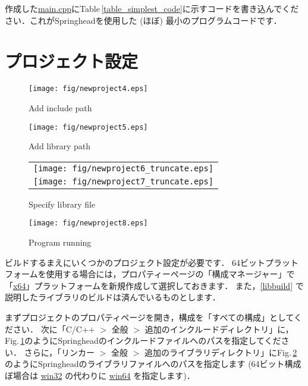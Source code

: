 \KLUDGE 作成した\url{main.cpp}\KLUDGE にTable\,\ref{table_simplest_code}\KLUDGE に示すコードを書き込んでください．これがSpringhead\KLUDGE を使用した (\KLUDGE ほぼ) \KLUDGE 最小のプログラムコードです．

\section*{\KLUDGE プロジェクト設定}

\begin{figure}[t]
\begin{center}
\texttt{[image: fig/newproject4.eps]}
\end{center}
\caption{Add include path}
\label{fig_newproject4}
\end{figure}

\begin{figure}[t]
\begin{center}
\texttt{[image: fig/newproject5.eps]}
\end{center}
\caption{Add library path}
\label{fig_newproject5}
\end{figure}

\begin{figure}[t]
\begin{center}
\begin{tabular}{c}
\texttt{[image: fig/newproject6\_truncate.eps]} \\
\texttt{[image: fig/newproject7\_truncate.eps]}
\end{tabular}
\end{center}
\caption{Specify library file}
\label{fig_newproject6}
\end{figure}

\begin{figure}[t]
\begin{center}
\texttt{[image: fig/newproject8.eps]}
\end{center}
\caption{Program running}
\label{fig_newproject8}
\end{figure}

\KLUDGE ビルドするまえにいくつかのプロジェクト設定が必要です．
64\KLUDGE ビットプラットフォームを使用する場合には，プロパティーページの「構成マネージャー」で「\url{x64}\KLUDGE 」プラットフォームを新規作成して選択しておきます．
\KLUDGE また，\ref{libbuild} \KLUDGE で説明したライブラリのビルドは済んでいるものとします．

\KLUDGE まずプロジェクトのプロパティページを開き，構成を「すべての構成」としてください．
\KLUDGE 次に「C/C++ $>$ \KLUDGE 全般 $>$ \KLUDGE 追加のインクルードディレクトリ」に，Fig.\,\ref{fig_newproject4}\KLUDGE のようにSpringhead\KLUDGE のインクルードファイルへのパスを指定してください．
\KLUDGE さらに，「リンカー $>$ \KLUDGE 全般 $>$ \KLUDGE 追加のライブラリディレクトリ」にFig.\,\ref{fig_newproject5}\KLUDGE のようにSpringhead\KLUDGE のライブラリファイルへのパスを指定します (64\KLUDGE ビット構成ぼ場合は \url{win32} \KLUDGE の代わりに \url{win64} \KLUDGE を指定します)\KLUDGE ．

